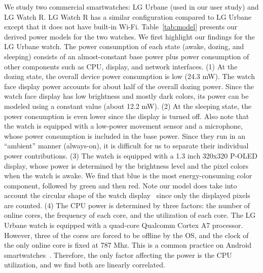 


We study two commercial smartwatches: LG Urbane (used in our user study) and LG Watch R.
LG Watch R has a similar configuration compared to LG Urbane except that it does not have built-in Wi-Fi.
%
%
Table~\ref{tab:model} presents our derived power models for the two watches.
We first highlight our findings for the LG Urbane watch.
The power consumption of each state (awake, dozing, and sleeping) consists of an almost-constant base power plus power consumption of other components such as CPU, display, and network interfaces.
(1) At the dozing state, the overall device power consumption is low (24.3 mW).
The watch face display power accounts for about half of the overall dozing power. Since the watch face display has low brightness and mostly dark colors, its power can be modeled using a constant value (about 12.2 mW).
(2)
At the sleeping state, the power consumption is even lower since the display is turned off.
%
Also note that the watch is equipped with a low-power movement sensor and a microphone, whose power consumption is included in the base power. Since they run in an ``ambient'' manner (\ie always-on), it is difficult for us to separate their individual power contributions.
(3) The watch is equipped with a 1.3 inch 320x320 P-OLED display, whose power is determined by the brightness level and the pixel colors~\cite{dong09_dac, dong11_mobisys} when the watch is awake. We find that blue is the most energy-consuming color component, followed by green and then red. Note our model does take into account the circular shape of the watch display~\cite{miao16_hotmobile} since only the displayed pixels are counted.
(4) The CPU power is determined by three factors: the number of online cores, the frequency of each core, and the utilization of each core. The LG Urbane watch is equipped with a quad-core Qualcomm Cortex A7 processor. However, three of the cores are forced to be offline by the OS, and the clock of the only online core is fixed at 787 Mhz. This is a common practice on Android smartwatches~\cite{liu16_mobisys}. Therefore, the only factor affecting the power is the CPU utilization, and we find both are linearly correlated.
